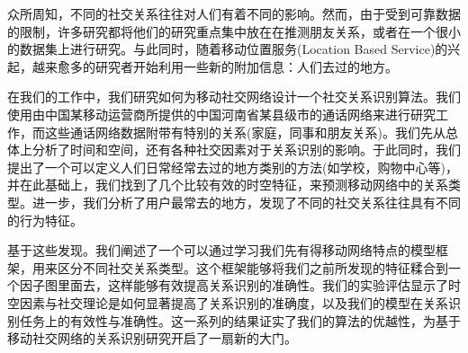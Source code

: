 
\begin{cabstract}
众所周知，不同的社交关系往往对人们有着不同的影响。然而，由于受到可靠数据的限制，许多研究都将他们的研究重点集中放在在推测朋友关系，或者在一个很小的数据集上进行研究。与此同时，随着移动位置服务(Location Based Service)的兴起，越来愈多的研究者开始利用一些新的附加信息：人们去过的地方。

在我们的工作中，我们研究如何为移动社交网络设计一个社交关系识别算法。我们使用由中国某移动运营商所提供的中国河南省某县级市的通话网络来进行研究工作，而这些通话网络数据附带有特别的关系(家庭，同事和朋友关系)。我们先从总体上分析了时间和空间，还有各种社交因素对于关系识别的影响。于此同时，我们提出了一个可以定义人们日常经常去过的地方类别的方法(如学校，购物中心等)，并在此基础上，我们找到了几个比较有效的时空特征，来预测移动网络中的关系类型。进一步，我们分析了用户最常去的地方，发现了不同的社交关系往往具有不同的行为特征。

基于这些发现。我们阐述了一个可以通过学习我们先有得移动网络特点的模型框架，用来区分不同社交关系类型。这个框架能够将我们之前所发现的特征糅合到一个因子图里面去，这样能够有效提高关系识别的准确性。我们的实验评估显示了时空因素与社交理论是如何显著提高了关系识别的准确度，以及我们的模型在关系识别任务上的有效性与准确性。这一系列的结果证实了我们的算法的优越性，为基于移动社交网络的关系识别研究开启了一扇新的大门。

\end{cabstract}

